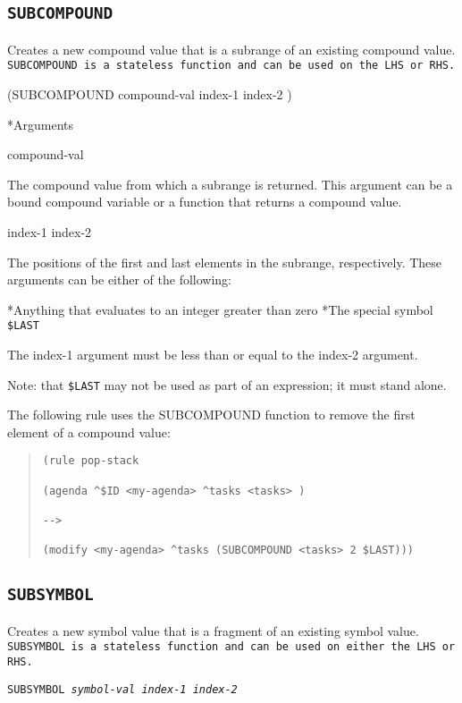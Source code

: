 {{\subsection{\tt{SUBCOMPOUND}}

Creates a new compound value that is a subrange of an existing
compound value. \tt{SUBCOMPOUND} is a stateless function and can be used on
the LHS or RHS.

\Format

(SUBCOMPOUND compound-val index-1 index-2 )

*Arguments

compound-val

The compound value from which a subrange is returned. This
argument can be a bound compound variable or a function that
returns a compound value.

index-1 index-2

The positions of the first and last elements in the subrange,
respectively. These arguments can be either of the following:

*Anything that evaluates to an integer greater than zero
*The special symbol \verb|$LAST|

The index-1 argument must be less than or equal to the
index-2 argument.

Note: that \verb|$LAST| may not be used as part of an expression; it
must stand alone.

\Example

The following rule uses the SUBCOMPOUND function to remove
the first element of a compound value:
\begin{quote}
\begin{verbatim}
(rule pop-stack

(agenda ^$ID <my-agenda> ^tasks <tasks> )

-->

(modify <my-agenda> ^tasks (SUBCOMPOUND <tasks> 2 $LAST)))
\end{verbatim}
\end{quote}

\subsection{\tt{SUBSYMBOL}}

Creates a new symbol value that is a fragment of an existing
symbol value. \tt{SUBSYMBOL} is a stateless function and can be
used on either the LHS or RHS.

\Format

\tt{SUBSYMBOL} \it{symbol-val} \it{index-1} \it{index-2}

}}
